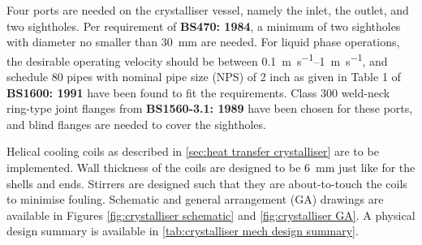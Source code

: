 Four ports are needed on the crystalliser vessel, namely the inlet, the outlet, and two sightholes. Per requirement of \textbf{BS470: 1984}, a minimum of two sightholes with diameter no smaller than \SI{30}{\mm} are needed. For liquid phase operations, the desirable operating velocity should be between \SIrange{0.1}{1}{\m\per\s}, and schedule 80 pipes with nominal pipe size (NPS) of 2 inch as given in Table 1 of \textbf{BS1600: 1991} have been found to fit the requirements. Class 300 weld-neck ring-type joint flanges from \textbf{BS1560-3.1: 1989} have been chosen for these ports, and blind flanges are needed to cover the sightholes. 


Helical cooling coils as described in \cref{sec:heat transfer crystalliser} are to be implemented. Wall thickness of the coils are designed to be \SI{6}{\mm} just like for the shells and ends. Stirrers are designed such that they are about-to-touch the coils to minimise fouling. Schematic and general arrangement (GA) drawings are available in Figures \ref{fig:crystalliser schematic} and \ref{fig:crystalliser GA}. A physical design summary is available in \cref{tab:crystalliser mech design summary}. 

